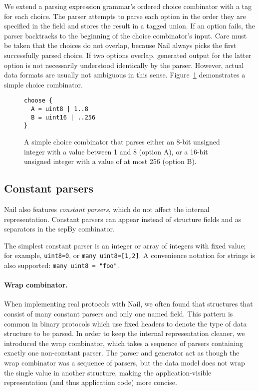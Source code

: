 We extend a parsing expression grammar's ordered choice combinator with
a tag for each choice. The parser
attempts to parse each option in the order they are specified in the field and
stores the result in a tagged union. If an option fails, the parser backtracks
to the beginning of the choice combinator's input. Care must be taken that the
choices do not overlap, because Nail always picks the first successfully
parsed choice. If two options overlap, generated output for the latter option is
not necessarily understood identically by the parser. However, actual data
formats are usually not ambiguous in this sense.
Figure~\ref{fig:choice} demonstrates a simple choice combinator.

\begin{figure}[tb]
\begin{verbatim}
choose {
  A = uint8 | 1..8
  B = uint16 | ..256
}
\end{verbatim}
\caption{A simple choice combinator that parses either an 8-bit unsigned
integer with a value between 1 and 8 (option A), or a 16-bit unsigned
integer with a value of at most 256 (option B).}
\label{fig:choice}
\end{figure}

\subsection{Constant parsers}

Nail also features \emph{constant parsers}, which do not affect the internal
representation. Constant parsers can appear instead of structure fields and as
separators in the sepBy combinator.

The simplest constant parser is an integer or array of integers with fixed
value; for example, \texttt{uint8=0}, or \texttt{many uint8=[1,2]}. A convenience notation
for strings is also supported: \texttt{many uint8 = "foo"}.

\paragraph{Wrap combinator.} When implementing real protocols with Nail, we often found that
structures that consist of many constant parsers and only one named field. This pattern is
common in binary protocols which use fixed headers to denote the type of data
structure to be parsed.  In order to keep the internal representation cleaner,
we introduced the wrap combinator, which takes a sequence of parsers containing
exactly one non-constant parser. The parser and generator act as though the wrap
combinator was a sequence of parsers, but the data model does not wrap the
single value in another structure, making the application-visible representation
(and thus application code) more concise.

